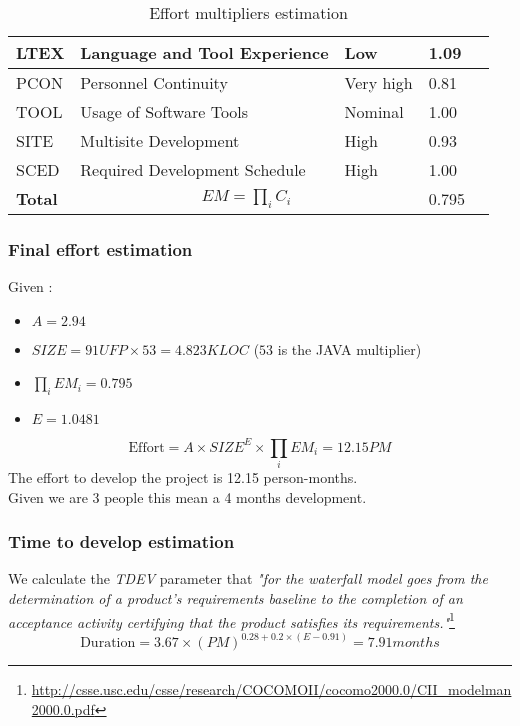 \begin{table}[!htbp]
\begin{tabular}{| l | l | l | l | l |}
        \hline
        LTEX            & Language and Tool Experience              & Low                  & 1.09              \\
        \hline
        PCON            & Personnel Continuity                      & Very high            & 0.81              \\
        \hline
        TOOL            & Usage of Software Tools                   & Nominal              & 1.00              \\
        \hline
        SITE            & Multisite Development                     & High                 & 0.93              \\
        \hline
        SCED            & Required Development Schedule             & High                 & 1.00              \\
        \hline
        \textbf{Total}  & \multicolumn{2}{|c|}{$EM=\prod_i C_i$}                              & 0.795             \\
        \hline
    \end{tabular}
    \caption{Effort multipliers estimation}
    \label{tab:cost-drivers}
\end{table}

\subsubsection{Final effort estimation}
\label{sub:effort_estimation}
Given :
\begin{itemize}
	\item $A = 2.94$
	\item $SIZE = 91UFP  \times  53  = 4.823  KLOC$ ($53$ is the JAVA multiplier)
	\item $\prod_i EM_i = 0.795$
	\item $E = 1.0481$
\end{itemize}

\begin{equation}
    \textrm{Effort} = A \times SIZE^E \times \prod_i EM_i = 12.15 PM
    \label{eq:effort}
\end{equation}
The effort to develop the project is 12.15 person-months.\\
Given we are 3 people this mean a 4 months development. 

\subsubsection{Time to develop estimation}
\label{sub:time_to_develop}
We calculate the \emph{TDEV} parameter that \emph{"for the waterfall model goes from the determination of a product's requirements baseline to the completion of an acceptance activity certifying that the product satisfies its requirements."}\footnote{\url{http://csse.usc.edu/csse/research/COCOMOII/cocomo2000.0/CII_modelman2000.0.pdf}}
\begin{equation}
    \textrm{Duration} = 3.67 \times (PM)^{0.28 + 0.2 \times (E-0.91)} = 7.91 months
    \label{eq:duration}
\end{equation}
